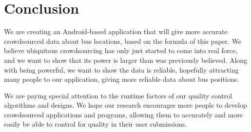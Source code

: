 \documentclass[9pt,twocolumn]{article}
\begin{document}
	
	\section*{Conclusion}	
	We are creating an Android-based application that will give more accurate crowdsourced data about bus locations, based on the formula of this paper. We believe ubiquitous crowdsourcing has only just started to come into real force, and we want to show that its power is larger than was previously believed. Along with being powerful, we want to show the data is reliable, hopefully attracting many people to our application, giving more reliable data about bus positions. 
	
	We are paying special attention to the runtime factors of our quality control algorithms and designs. We hope our research encourages more people to develop crowdsourced applications and programs, allowing them to accurately and more easily be able to control for quality in their user submissions.
	
	\newpage
	
\end{document}
